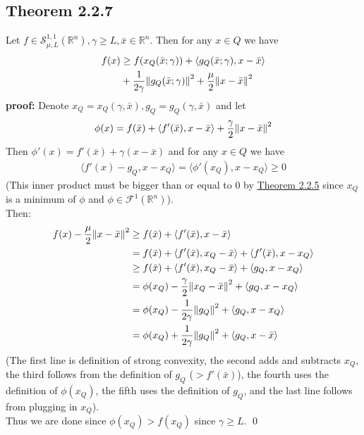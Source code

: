 \documentclass[12pt,a4paper]{article}
\begin{document}
	\subsection*{Theorem 2.2.7}\label{thm227}
	Let $f \in \mathcal{S}_{\mu, L}^{1,1}(\mathbb{R}^n), \gamma \geq L, \bar{x} \in \mathbb{R}^n$. Then for any $x \in Q$ we have
	\begin{align*}
		f(x) & \geq f(x_Q(\bar{x};\gamma)) + \langle g_Q(\bar{x};\gamma), x - \bar{x} \rangle \\
		&+ \frac{1}{2\gamma}\norm{g_Q(\bar{x};\gamma)}^2 + \frac{\mu}{2}\norm{x - \bar{x}}^2
	\end{align*}
	\textbf{proof:} Denote $x_Q = x_Q(\gamma, \bar{x}), g_Q = g_Q(\gamma, \bar{x})$ and let
	\begin{align*}
		\phi(x) = f(\bar{x}) + \langle f'(\bar{x}), x - \bar{x} \rangle + \frac{\gamma}{2}\norm{x - \bar{x}}^2
	\end{align*}
	Then $\phi'(x) = f'(\bar{x}) + \gamma(x - \bar{x})$ and for any $x \in Q$ we have
	\begin{align*}
		\langle f'(x) - g_Q, x - x_Q \rangle = \langle \phi'(x_Q), x - x_Q \rangle \geq 0
	\end{align*}
	(This inner product must be bigger than or equal to $0$ by \hyperref[thm225]{Theorem 2.2.5} since $x_Q$ is a minimum of $\phi$ and $\phi \in \mathcal{F}^1(\mathbb{R}^n)$). \\
	Then:
	\begin{align*}
		f(x) - \frac{\mu}{2}\norm{x - \bar{x}}^2 &\geq f(\bar{x}) + \langle f'(\bar{x}), x - \bar{x} \rangle \\
		&= f(\bar{x}) + \langle f'(\bar{x}), x_Q - \bar{x} \rangle + \langle f'(\bar{x}), x - x_Q \rangle \\
		& \geq f(\bar{x}) + \langle f'(\bar{x}), x_Q - \bar{x} \rangle + \langle g_Q, x - x_Q \rangle \\
		&= \phi(x_Q) - \frac{\gamma}{2}\norm{x_Q - \bar{x}}^2 + \langle g_Q, x - x_Q \rangle \\
		&= \phi(x_Q) - \frac{1}{2\gamma}\norm{g_Q}^2 + \langle g_Q, x - x_Q \rangle \\
		&= \phi(x_Q) + \frac{1}{2\gamma}\norm{g_Q}^2 + \langle g_Q, x - \bar{x} \rangle
	\end{align*}
	(The first line is definition of strong convexity, the second adds and subtracts $x_Q$, the third follows from the definition of $g_Q$ ($> f'(\bar{x})$), the fourth uses the definition of $\phi(x_Q)$, the fifth uses the definition of $g_Q$, and the last line follows from plugging in $x_Q$). \\
	Thus we are done since $\phi(x_Q) > f(x_Q)$ since $\gamma \geq L$. \qed
	
\end{document}
